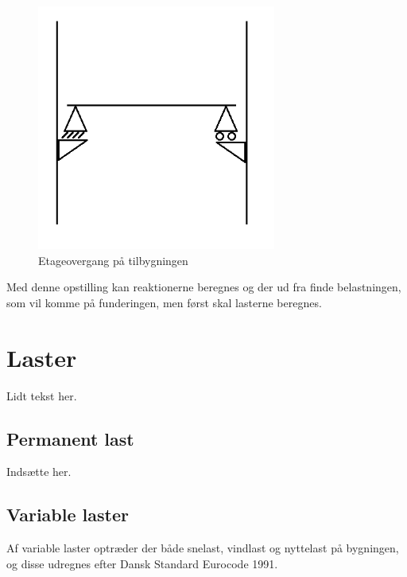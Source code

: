 \begin{figure}[htbp]
	\centering
	\includegraphics[width=0.7\textwidth]{billeder/etageovergang.png}
	\caption{Etageovergang på tilbygningen}
	\label{fig:etage}
\end{figure}

Med denne opstilling kan reaktionerne beregnes og der ud fra finde belastningen, som vil komme på funderingen, men først skal lasterne beregnes.

\section{Laster}
Lidt tekst her.

\subsection{Permanent last}
Indsætte her.

\subsection{Variable laster}
Af variable laster optræder der både snelast, vindlast og nyttelast på bygningen, og disse udregnes efter Dansk Standard Eurocode 1991.

